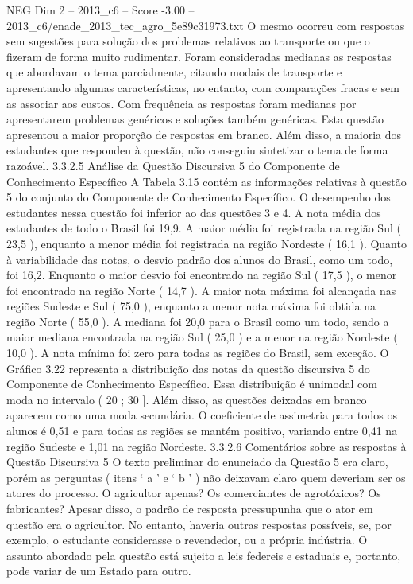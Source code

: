 \begin{textsample}{NEG Dim 2 – 2013\_c6 – Score -3.00 – 2013\_c6/enade\_2013\_tec\_agro\_5e89c31973.txt}
O mesmo ocorreu com respostas sem sugestões para solução dos problemas relativos ao transporte ou que o fizeram de forma muito rudimentar.
Foram consideradas medianas as respostas que abordavam o tema parcialmente, citando modais de transporte e apresentando algumas características, no entanto, com comparações fracas e sem as associar aos custos.
Com frequência as respostas foram medianas por apresentarem problemas genéricos e soluções também genéricas.
Esta questão apresentou a maior proporção de respostas em branco.
Além disso, a maioria dos estudantes que respondeu à questão, não conseguiu sintetizar o tema de forma razoável. 3.3.2.5 Análise da Questão Discursiva 5 do Componente de Conhecimento Específico A Tabela 3.15 contém as informações relativas à questão 5 do conjunto do Componente de Conhecimento Específico.
O desempenho dos estudantes nessa questão foi inferior ao das questões 3 e 4.
A nota média dos estudantes de todo o Brasil foi 19,9.
A maior média foi registrada na região Sul ( 23,5 ), enquanto a menor média foi registrada na região Nordeste ( 16,1 ).
Quanto à variabilidade das notas, o desvio padrão dos alunos do Brasil, como um todo, foi 16,2.
Enquanto o maior desvio foi encontrado na região Sul ( 17,5 ), o menor foi encontrado na região Norte ( 14,7 ).
A maior nota máxima foi alcançada nas regiões Sudeste e Sul ( 75,0 ), enquanto a menor nota máxima foi obtida na região Norte ( 55,0 ).
A mediana foi 20,0 para o Brasil como um todo, sendo a maior mediana encontrada na região Sul ( 25,0 ) e a menor na região Nordeste ( 10,0 ).
A nota mínima foi zero para todas as regiões do Brasil, sem exceção.
O Gráfico 3.22 representa a distribuição das notas da questão discursiva 5 do Componente de Conhecimento Específico.
Essa distribuição é unimodal com moda no intervalo ( 20 ; 30 ].
Além disso, as questões deixadas em branco aparecem como uma moda secundária.
O coeficiente de assimetria para todos os alunos é 0,51 e para todas as regiões se mantém positivo, variando entre 0,41 na região Sudeste e 1,01 na região Nordeste. 3.3.2.6 Comentários sobre as respostas à Questão Discursiva 5 O texto preliminar do enunciado da Questão 5 era claro, porém as perguntas ( itens ‘ a ’ e ‘ b ’ ) não deixavam claro quem deveriam ser os atores do processo.
O agricultor apenas?
Os comerciantes de agrotóxicos?
Os fabricantes?
Apesar disso, o padrão de resposta pressupunha que o ator em questão era o agricultor.
No entanto, haveria outras respostas possíveis, se, por exemplo, o estudante considerasse o revendedor, ou a própria indústria.
O assunto abordado pela questão está sujeito a leis federeis e estaduais e, portanto, pode variar de um Estado para outro.

\end{textsample}
